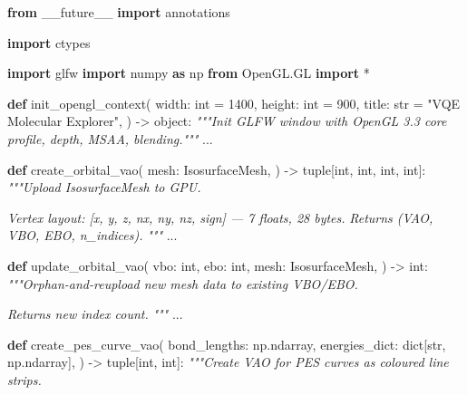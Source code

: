 \documentclass[
  11pt,
]{report}
\newenvironment{Shaded}{}{}
\newcommand{\BuiltInTok}[1]{\textcolor[rgb]{0.00,0.50,0.00}{#1}}
\newcommand{\CommentTok}[1]{\textcolor[rgb]{0.38,0.63,0.69}{\textit{#1}}}
\newcommand{\DecValTok}[1]{\textcolor[rgb]{0.25,0.63,0.44}{#1}}
\newcommand{\ImportTok}[1]{\textcolor[rgb]{0.00,0.50,0.00}{\textbf{#1}}}
\newcommand{\KeywordTok}[1]{\textcolor[rgb]{0.00,0.44,0.13}{\textbf{#1}}}
\newcommand{\NormalTok}[1]{#1}
\newcommand{\OperatorTok}[1]{\textcolor[rgb]{0.40,0.40,0.40}{#1}}
\newcommand{\StringTok}[1]{\textcolor[rgb]{0.25,0.44,0.63}{#1}}
\begin{document}
\begin{Shaded}
\begin{Highlighting}[]
\ImportTok{from}\NormalTok{ \_\_future\_\_ }\ImportTok{import}\NormalTok{ annotations}

\ImportTok{import}\NormalTok{ ctypes}

\ImportTok{import}\NormalTok{ glfw}
\ImportTok{import}\NormalTok{ numpy }\ImportTok{as}\NormalTok{ np}
\ImportTok{from}\NormalTok{ OpenGL.GL }\ImportTok{import} \OperatorTok{*}


\KeywordTok{def}\NormalTok{ init\_opengl\_context(}
\NormalTok{    width: }\BuiltInTok{int} \OperatorTok{=} \DecValTok{1400}\NormalTok{,}
\NormalTok{    height: }\BuiltInTok{int} \OperatorTok{=} \DecValTok{900}\NormalTok{,}
\NormalTok{    title: }\BuiltInTok{str} \OperatorTok{=} \StringTok{"VQE Molecular Explorer"}\NormalTok{,}
\NormalTok{) }\OperatorTok{{-}\textgreater{}} \BuiltInTok{object}\NormalTok{:}
    \CommentTok{"""Init GLFW window with OpenGL 3.3 core profile, depth, MSAA, blending."""}
\NormalTok{    ...}


\KeywordTok{def}\NormalTok{ create\_orbital\_vao(}
\NormalTok{    mesh: IsosurfaceMesh,}
\NormalTok{) }\OperatorTok{{-}\textgreater{}} \BuiltInTok{tuple}\NormalTok{[}\BuiltInTok{int}\NormalTok{, }\BuiltInTok{int}\NormalTok{, }\BuiltInTok{int}\NormalTok{, }\BuiltInTok{int}\NormalTok{]:}
    \CommentTok{"""Upload IsosurfaceMesh to GPU.}

\CommentTok{    Vertex layout: [x, y, z, nx, ny, nz, sign] — 7 floats, 28 bytes.}
\CommentTok{    Returns (VAO, VBO, EBO, n\_indices).}
\CommentTok{    """}
\NormalTok{    ...}


\KeywordTok{def}\NormalTok{ update\_orbital\_vao(}
\NormalTok{    vbo: }\BuiltInTok{int}\NormalTok{,}
\NormalTok{    ebo: }\BuiltInTok{int}\NormalTok{,}
\NormalTok{    mesh: IsosurfaceMesh,}
\NormalTok{) }\OperatorTok{{-}\textgreater{}} \BuiltInTok{int}\NormalTok{:}
    \CommentTok{"""Orphan{-}and{-}reupload new mesh data to existing VBO/EBO.}

\CommentTok{    Returns new index count.}
\CommentTok{    """}
\NormalTok{    ...}


\KeywordTok{def}\NormalTok{ create\_pes\_curve\_vao(}
\NormalTok{    bond\_lengths: np.ndarray,}
\NormalTok{    energies\_dict: }\BuiltInTok{dict}\NormalTok{[}\BuiltInTok{str}\NormalTok{, np.ndarray],}
\NormalTok{) }\OperatorTok{{-}\textgreater{}} \BuiltInTok{tuple}\NormalTok{[}\BuiltInTok{int}\NormalTok{, }\BuiltInTok{int}\NormalTok{]:}
    \CommentTok{"""Create VAO for PES curves as coloured line strips.}


\end{Highlighting}
\end{Shaded}
\end{document}
